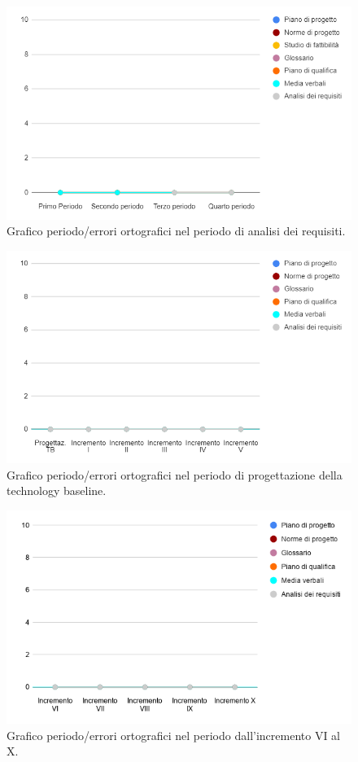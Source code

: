 \begin{figure}[H]
	\centering
	\includegraphics[width=0.8\linewidth]{./res/images/ortografia_1.png}
	\caption{Grafico periodo/errori ortografici nel periodo di analisi dei requisiti.}
	\label{fig:Grafico errori ortografici durante il periodo di analisi dei requisiti.}
\end{figure}

\begin{figure}[H]
	\centering
	\includegraphics[width=0.8\linewidth]{./res/images/ortografia_2.png}
	\caption{Grafico periodo/errori ortografici nel periodo di progettazione della technology baseline.}
	\label{fig:Grafico errori ortografici durante il periodo di progettazione della technology baseline.}
\end{figure}

\begin{figure}[H]
	\centering
	\includegraphics[width=0.8\linewidth]{./res/images/ortografia_3.png}
	\caption{Grafico periodo/errori ortografici nel periodo dall'incremento VI al X.}
	\label{fig:Grafico errori ortografici durante il periodo dall'incremento VI al X.}
\end{figure}

